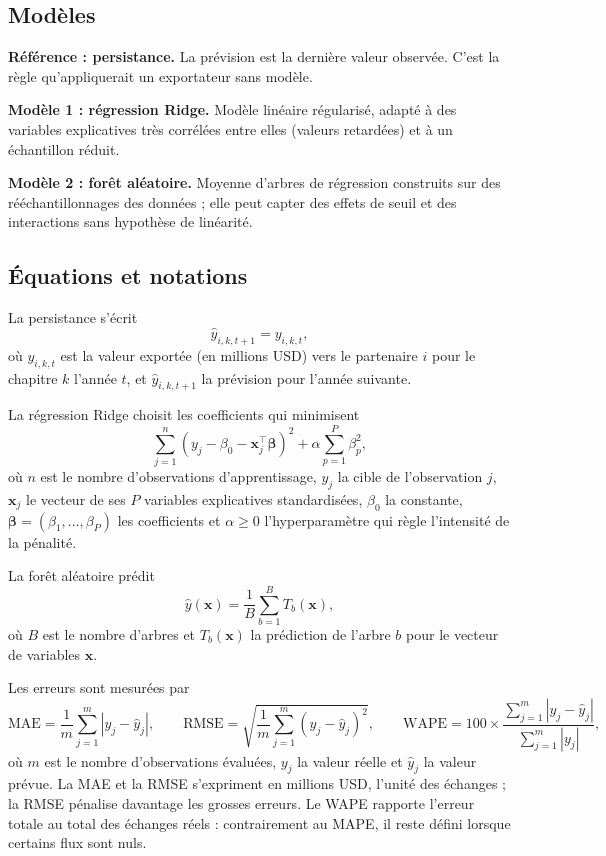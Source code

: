 \documentclass[11pt,a4paper]{article}
\begin{document}
\subsection{Modèles}
\textbf{Référence : persistance.} La prévision est la dernière valeur observée. C'est la règle qu'appliquerait un exportateur sans modèle.

\textbf{Modèle 1 : régression Ridge.} Modèle linéaire régularisé, adapté à des variables explicatives très corrélées entre elles (valeurs retardées) et à un échantillon réduit.

\textbf{Modèle 2 : forêt aléatoire.} Moyenne d'arbres de régression construits sur des rééchantillonnages des données ; elle peut capter des effets de seuil et des interactions sans hypothèse de linéarité.

\subsection{Équations et notations}
La persistance s'écrit
\begin{equation}\label{eq:pers}
\widehat{y}_{i,k,t+1} = y_{i,k,t},
\end{equation}
où $y_{i,k,t}$ est la valeur exportée (en millions USD) vers le partenaire $i$ pour le chapitre $k$ l'année $t$, et $\widehat{y}_{i,k,t+1}$ la prévision pour l'année suivante.

La régression Ridge choisit les coefficients qui minimisent
\begin{equation}\label{eq:ridge}
\sum_{j=1}^{n}\left(y_j - \beta_0 - \mathbf{x}_j^{\top}\boldsymbol{\beta}\right)^2 + \alpha \sum_{p=1}^{P}\beta_p^2 ,
\end{equation}
où $n$ est le nombre d'observations d'apprentissage, $y_j$ la cible de l'observation $j$, $\mathbf{x}_j$ le vecteur de ses $P$ variables explicatives standardisées, $\beta_0$ la constante, $\boldsymbol{\beta} = (\beta_1,\dots,\beta_P)$ les coefficients et $\alpha \geq 0$ l'hyperparamètre qui règle l'intensité de la pénalité.

La forêt aléatoire prédit
\begin{equation}\label{eq:rf}
\widehat{y}(\mathbf{x}) = \frac{1}{B}\sum_{b=1}^{B} T_b(\mathbf{x}),
\end{equation}
où $B$ est le nombre d'arbres et $T_b(\mathbf{x})$ la prédiction de l'arbre $b$ pour le vecteur de variables $\mathbf{x}$.

Les erreurs sont mesurées par
\begin{equation}\label{eq:metriques}
\mathrm{MAE}=\frac{1}{m}\sum_{j=1}^{m}\left|y_j-\widehat{y}_j\right|,\qquad
\mathrm{RMSE}=\sqrt{\frac{1}{m}\sum_{j=1}^{m}\left(y_j-\widehat{y}_j\right)^2},\qquad
\mathrm{WAPE}=100\times\frac{\sum_{j=1}^{m}\left|y_j-\widehat{y}_j\right|}{\sum_{j=1}^{m}\left|y_j\right|},
\end{equation}
où $m$ est le nombre d'observations évaluées, $y_j$ la valeur réelle et $\widehat{y}_j$ la valeur prévue. La MAE et la RMSE s'expriment en millions USD, l'unité des échanges ; la RMSE pénalise davantage les grosses erreurs. Le WAPE rapporte l'erreur totale au total des échanges réels : contrairement au MAPE, il reste défini lorsque certains flux sont nuls.
\end{document}
